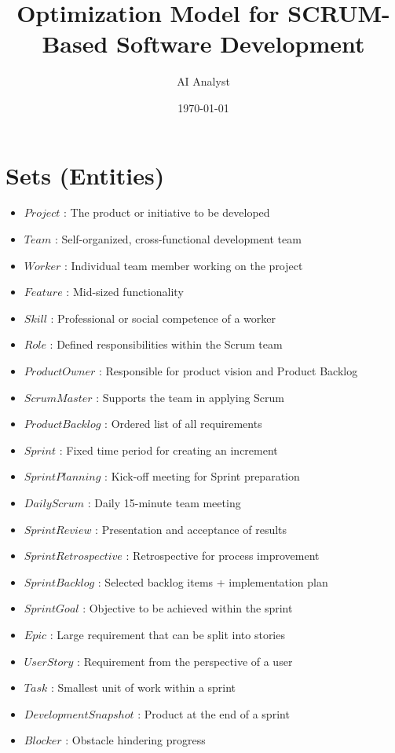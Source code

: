 \documentclass[11pt]{article}
\title{Optimization Model for SCRUM-Based Software Development}
\author{AI Analyst}
\date{\today}
\begin{document}
\maketitle
\tableofcontents
\newpage

\section{Sets (Entities)}
\begin{itemize}
    \item $Project$ : The product or initiative to be developed
    \item $Team$ : Self-organized, cross-functional development team
    \item $Worker$ : Individual team member working on the project
    \item $Feature$ : Mid-sized functionality
    \item $Skill$ : Professional or social competence of a worker
    \item $Role$ : Defined responsibilities within the Scrum team
    \item $ProductOwner$ : Responsible for product vision and Product Backlog
    \item $ScrumMaster$ : Supports the team in applying Scrum
    \item $ProductBacklog$ : Ordered list of all requirements
    \item $Sprint$ : Fixed time period for creating an increment
    \item $SprintPlanning$ : Kick-off meeting for Sprint preparation
    \item $DailyScrum$ : Daily 15-minute team meeting
    \item $SprintReview$ : Presentation and acceptance of results
    \item $SprintRetrospective$ : Retrospective for process improvement
    \item $SprintBacklog$ : Selected backlog items + implementation plan
    \item $SprintGoal$ : Objective to be achieved within the sprint
    \item $Epic$ : Large requirement that can be split into stories
    \item $UserStory$ : Requirement from the perspective of a user
    \item $Task$ : Smallest unit of work within a sprint
    \item $DevelopmentSnapshot$ : Product at the end of a sprint
    \item $Blocker$ : Obstacle hindering progress

\end{itemize}
\end{document}
